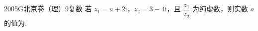 
\begin{problem}{2005}{G}{北京卷（理）}{9}{复数}
若 $ z_1=a+2\mathrm{i} $，$ z_2=3-4\mathrm{i} $，且 $ \dfrac{z_1}{z_2} $ 为纯虚数，则实数 $ a $ 的值为\underline{\hspace{4em}}.
\end{problem}

\begin{answer}

\end{answer}

\begin{solutions}

\end{solutions}